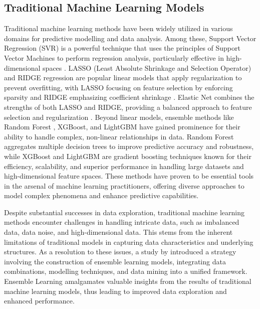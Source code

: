 \documentclass[10pt, a4paper, oneside]{article}
\begin{document}
\subsection{Traditional Machine Learning Models}
Traditional machine learning methods have been widely utilized in various domains for predictive modelling and data analysis. Among these, Support Vector Regression (SVR) is a powerful technique that uses the principles of Support Vector Machines to perform regression analysis, particularly effective in high-dimensional spaces \cite{almaspoor2021support}. LASSO (Least Absolute Shrinkage and Selection Operator) and RIDGE regression are popular linear models that apply regularization to prevent overfitting, with LASSO focusing on feature selection by enforcing sparsity \cite{tibshirani1996regression} and RIDGE emphasizing coefficient shrinkage \cite{van2015lecture}. Elastic Net combines the strengths of both LASSO and RIDGE, providing a balanced approach to feature selection and regularization \cite{zou2005regularization}. Beyond linear models, ensemble methods like Random Forest \cite{hien2021artwork}, XGBoost, and LightGBM have gained prominence for their ability to handle complex, non-linear relationships in data. Random Forest aggregates multiple decision trees to improve predictive accuracy and robustness, while XGBoost and LightGBM are gradient boosting techniques known for their efficiency, scalability, and superior performance in handling large datasets and high-dimensional feature spaces. These methods have proven to be essential tools in the arsenal of machine learning practitioners, offering diverse approaches to model complex phenomena and enhance predictive capabilities.

Despite substantial successes in data exploration, traditional machine learning methods encounter challenges in handling intricate data, such as imbalanced data, data noise, and high-dimensional data. This stems from the inherent limitations of traditional models in capturing data characteristics and underlying structures. As a resolution to these issues, a study by \cite{dong2020survey} introduced a strategy involving the construction of ensemble learning models, integrating data combinations, modelling techniques, and data mining into a unified framework. Ensemble Learning amalgamates valuable insights from the results of traditional machine learning models, thus leading to improved data exploration and enhanced performance.
\end{document}
